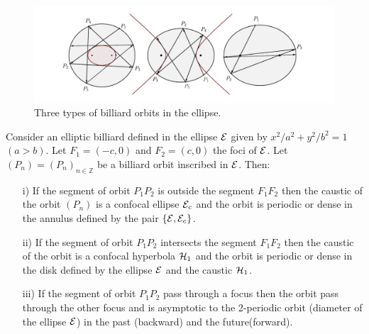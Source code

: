  \begin{figure}
	\begin{center}
	 \includegraphics[scale=0.55]{chap_05/pics/pics-05-3tipos-orbitas.pdf}
		\caption{Three types of billiard orbits in the ellipse.}
	\end{center}
\label{fig:caustic1}
\end{figure} 
 
 \begin{theorem}
 Consider an  elliptic billiard defined  in the ellipse $\mathcal{E}$ given by $x^2/a^2+y^2/b^2=1$ $(a>b)$. Let $F_1=(-c,0)$ and $F_2=(c,0) $ the foci of $\mathcal{E}$. Let $(P_n)=(P_n)_{n\in\mathbb{Z}}$ be a billiard orbit inscribed in $\mathcal{E}$. Then:
 
 \begin{itemize} 
 \item[i)] If the segment of orbit $P_1 P_2$ is outside the segment $F_1F_2$ then the caustic of the orbit $(P_n)$ is a confocal ellipse $\mathcal{E}_c$ and the orbit is periodic or dense in the annulus defined by the pair  $\{\mathcal{E},   \mathcal{E}_c \}$.
 
  \item[ii)] If the segment of orbit $P_1P_2$   intersects the segment $F_1F_2$ then the caustic of the orbit is a confocal hyperbola  $\mathcal{H}_1$ and the orbit is periodic or dense in the disk defined by the ellipse $\mathcal{E}$ and the caustic $\mathcal{H}_1$.
  
   \item[iii)] If the segment of orbit $P_1P_2$ pass through a focus  then the orbit pass through the other focus and is asymptotic to the 2-periodic orbit (diameter of the ellipse $\mathcal{E}$) in the past (backward) and  the future(forward).
\end{itemize}
\end{theorem}

